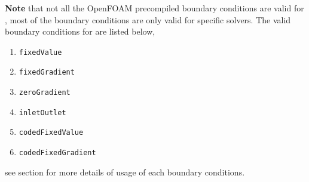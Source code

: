 \textbf{Note} that not all the OpenFOAM precompiled boundary conditions are valid for \foam , most of the boundary conditions are only valid for specific solvers. 
The valid boundary conditions for \foam are listed below,

\begin{enumerate}
	\item \texttt{fixedValue}
	\item \texttt{fixedGradient}
	\item \texttt{zeroGradient}
	\item \texttt{inletOutlet}
	\item \texttt{codedFixedValue}
	\item \texttt{codedFixedGradient}
\end{enumerate}
see  section for more details of usage of each boundary conditions.

